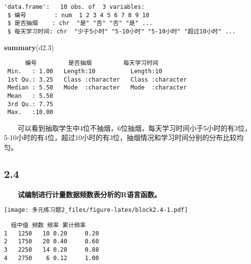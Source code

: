 \documentclass[
]{article}
\newenvironment{Shaded}{\begin{snugshade}}{\end{snugshade}}
\newcommand{\ControlFlowTok}[1]{\textcolor[rgb]{0.13,0.29,0.53}{\textbf{#1}}}
\newcommand{\DecValTok}[1]{\textcolor[rgb]{0.00,0.00,0.81}{#1}}
\newcommand{\FloatTok}[1]{\textcolor[rgb]{0.00,0.00,0.81}{#1}}
\newcommand{\KeywordTok}[1]{\textcolor[rgb]{0.13,0.29,0.53}{\textbf{#1}}}
\newcommand{\NormalTok}[1]{#1}
\newcommand{\OperatorTok}[1]{\textcolor[rgb]{0.81,0.36,0.00}{\textbf{#1}}}
\newcommand{\StringTok}[1]{\textcolor[rgb]{0.31,0.60,0.02}{#1}}
\begin{document}
\begin{verbatim}
'data.frame':   10 obs. of  3 variables:
 $ 编号        : num  1 2 3 4 5 6 7 8 9 10
 $ 是否抽烟    : chr  "是" "否" "否" "是" ...
 $ 每天学习时间: chr  "少于5小时" "5-10小时" "5-10小时" "超过10小时" ...
\end{verbatim}

\begin{Shaded}
\begin{Highlighting}[]
\KeywordTok{summary}\NormalTok{(d2}\FloatTok{.3}\NormalTok{)                               }
\end{Highlighting}
\end{Shaded}

\begin{verbatim}
      编号         是否抽烟         每天学习时间      
 Min.   : 1.00   Length:10          Length:10         
 1st Qu.: 3.25   Class :character   Class :character  
 Median : 5.50   Mode  :character   Mode  :character  
 Mean   : 5.50                                        
 3rd Qu.: 7.75                                        
 Max.   :10.00                                        
\end{verbatim}

　　可以看到抽取学生中4位不抽烟，6位抽烟，每天学习时间小于5小时的有3位，5-10小时的有4位，超过10小时的有3位，抽烟情况和学习时间分别的分布比较均匀。

\hypertarget{section-5}{%
\subsection{2.4　　　　}\label{section-5}}

　　\textbf{试编制进行计量数据频数表分析的R语言函数。}

\begin{Shaded}
\end{Shaded}

\texttt{[image: 多元练习题2\_files/figure-latex/block2.4-1.pdf]}

\begin{verbatim}
  组中值 频数 频率 累计频率
1   1250   10 0.20     0.20
2   1750   20 0.40     0.60
3   2250   14 0.28     0.88
4   2750    6 0.12     1.00
\end{verbatim}
\end{document}
